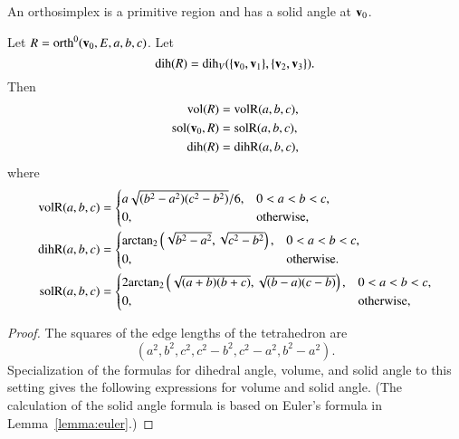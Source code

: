 An orthosimplex is a
primitive region and has a solid angle at ${\mathbf v}_0$.

\begin{lemma}[]\label{lemma:orth:abc} 
Let $R={\operatorname{orth}}^0({\mathbf v}_0,E,a,b,c)$.  Let 
\[ 
{\operatorname{dih}}(R) = \operatorname{dih}_V(\{{\mathbf v}_0,{\mathbf v}_1\},\{{\mathbf v}_2,{\mathbf v}_3\}).
\]  
Then
\begin{align*}
{\operatorname{vol}}(R) &= {\operatorname{volR}}(a,b,c),\\
\operatorname{sol}({\mathbf v}_0,R) &= {\operatorname{solR}}(a,b,c),\\
{\operatorname{dih}}(R) &= {\operatorname{dihR}}(a,b,c),\\
\end{align*}
where
\begin{align*}
\op{volR}(a,b,c) &= \begin{cases}
a\sqrt{(b^2-a^2)(c^2-b^2)}/6,& 0 < a < b < c,\\
0,&\text{otherwise,}
\end{cases}\vspace{6pt}\\
\op{dihR}(a,b,c) &= \begin{cases}
\atn\left(\sqrt{b^2 - a^2},\sqrt{c^2 - b^2}\right),
& 0 < a < b < c,\\
0,&\text{otherwise.}
\end{cases} \vspace{6pt}\\
\op{solR}(a,b,c)&= \begin{cases}
2 \atn\left(\sqrt{{(a+b)(b+c)}},
\sqrt{{(b-a) (c-b)}}\right),& 0 < a < b < c,\\
0,&\text{otherwise,}
\end{cases}
\end{align*}
%
%
%
\end{lemma}

\begin{proof}
The squares of the edge lengths of the tetrahedron are
\[ 
(a^2,b^2,c^2,c^2-b^2,c^2-a^2,b^2-a^2).
\] 
Specialization of the formulas for dihedral angle, volume, and solid
angle to this setting gives the following expressions for volume and solid
angle.  (The calculation of the solid angle formula is based on
Euler's formula in Lemma~\ref{lemma:euler}.)
\end{proof}

